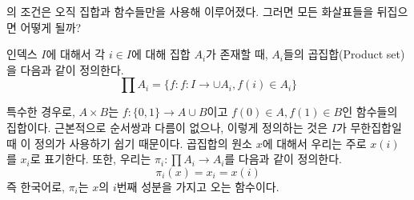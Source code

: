 의 조건은 오직 집합과 함수들만을 사용해 이루어졌다.
그러면 모든 화살표들을 뒤집으면 어떻게 될까?
\begin{definition}
\label{def:productset}
    인덱스 $I$에 대해서 각 $i \in I$에 대해 집합 $A_i$가 존재할 때, $A_i$들의 곱집합(Product set)을 다음과 같이 정의한다.
    \begin{equation*}
        \prod A_i = \{f: f : I \to \cup A_i, f(i) \in A_i\}
    \end{equation*}
\end{definition}
특수한 경우로, $A \times B$는 $f : \{0, 1\} \to A \cup B$이고 $f(0) \in A, f(1) \in B$인 함수들의 집합이다.
근본적으로 순서쌍과 다름이 없으나, 이렇게 정의하는 것은 $I$가 무한집합일 때 이 정의가 사용하기 쉽기 때문이다.
곱집합의 원소 $x$에 대해서 우리는 주로 $x(i)$를 $x_i$로 표기한다.
또한, 우리는 $\pi_i : \prod A_i \to A_i$를 다음과 같이 정의한다.
\begin{equation*}
    \pi_i(x) = x_i = x(i)
\end{equation*}
즉 한국어로, $\pi_i$는 $x$의 $i$번째 성분을 가지고 오는 함수이다.

